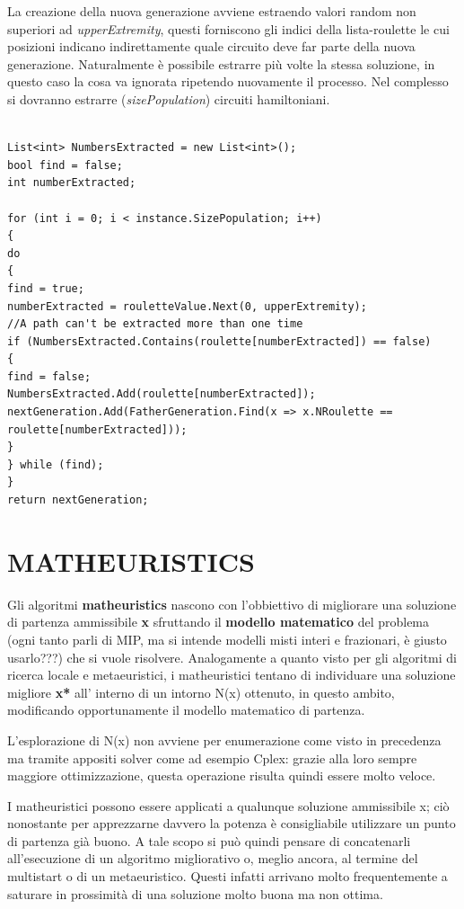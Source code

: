 \documentclass[11pt]{article}
\begin{document}
La creazione della nuova generazione avviene estraendo valori random non superiori ad \textit{upperExtremity}, questi forniscono gli indici della lista-roulette le cui posizioni indicano indirettamente quale circuito deve far parte della nuova generazione. Naturalmente è possibile estrarre più volte la stessa soluzione, in questo caso la cosa va ignorata ripetendo nuovamente il processo. Nel complesso si dovranno estrarre (\textit{sizePopulation}) circuiti hamiltoniani.

\begin{lstlisting}

List<int> NumbersExtracted = new List<int>();
bool find = false;
int numberExtracted;

for (int i = 0; i < instance.SizePopulation; i++)
{
do
{
find = true;
numberExtracted = rouletteValue.Next(0, upperExtremity);
//A path can't be extracted more than one time
if (NumbersExtracted.Contains(roulette[numberExtracted]) == false)
{
find = false;
NumbersExtracted.Add(roulette[numberExtracted]);
nextGeneration.Add(FatherGeneration.Find(x => x.NRoulette == roulette[numberExtracted]));
}
} while (find);
}
return nextGeneration;

\end{lstlisting}

\section*{MATHEURISTICS}

Gli algoritmi \textbf{matheuristics} nascono con l'obbiettivo di migliorare una soluzione di partenza ammissibile \textbf{x} sfruttando il \textbf{modello matematico} del problema (ogni tanto parli di MIP, ma si intende modelli misti interi e frazionari, è giusto usarlo???) che si vuole risolvere. Analogamente a quanto visto per gli algoritmi di ricerca locale e metaeuristici, i matheuristici tentano di individuare una soluzione migliore \textbf{x*} all' interno di un intorno N(x) ottenuto, in questo ambito, modificando opportunamente il modello matematico di partenza. 

L'esplorazione di N(x) non avviene per enumerazione come visto in precedenza ma tramite appositi solver come ad esempio Cplex: grazie alla loro sempre maggiore ottimizzazione, questa operazione risulta quindi essere molto veloce. 

I matheuristici possono essere applicati a qualunque soluzione ammissibile x; ciò nonostante per apprezzarne davvero la potenza è consigliabile utilizzare un punto di partenza già buono. A tale scopo si può quindi pensare di concatenarli  all'esecuzione di un algoritmo migliorativo o, meglio ancora, al termine del multistart o di un metaeuristico. Questi infatti arrivano molto frequentemente a saturare in prossimità di una soluzione molto buona \textbf{} ma non ottima. 
\end{document}
